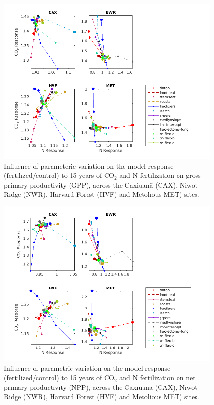 \documentclass[draft,linenumbers]{agujournal}
\begin{document}
      
 \begin{figure}[h]
     \centering
     \includegraphics[width=1.55\textwidth, left]{matlab/figures/NOVc_CNdep_GPP1__p2012.png}
     \caption{Influence of parameteric variation on the model response (fertilized/control) to 15 years of CO$_{2}$ and N fertilization on gross primary productivity (GPP), across the Caxiuan\~a (CAX), Niwot Ridge (NWR), Harvard Forest (HVF) and Metolious MET) sites. }
     \label{GPP CO2 and N respones 2001}
  \end{figure}
  
 \begin{figure}[h]
     \centering
     \includegraphics[width=1.55\textwidth, left]{matlab/figures/NOVc_CNdep_NPP1__p2012.png}
     \caption{Influence of parametric variation on the model response (fertilized/control) to 15 years of CO$_{2}$ and N fertilization on net primary productivity (NPP), across the Caxiuan\~a (CAX), Niwot Ridge (NWR), Harvard Forest (HVF) and Metolious MET) sites.}
     \label{NPP CO2 and N respones 2001}
  \end{figure}
  
\end{document}
